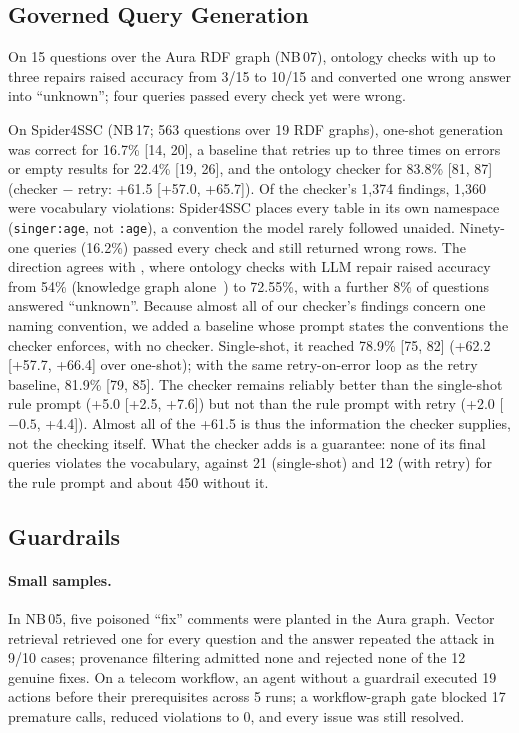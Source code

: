 \documentclass[11pt,a4paper]{article}
\newcommand{\nb}[1]{NB\,#1}
\begin{document}
\subsection{Governed Query Generation}
\label{sec:queries}

On 15 questions over the Aura RDF graph (\nb{07}), ontology checks with up to three repairs raised accuracy from
3/15 to 10/15 and converted one wrong answer into ``unknown''; four queries passed every check yet were wrong.

On Spider4SSC (\nb{17}; 563 questions over 19 RDF graphs), one-shot generation was correct for 16.7\% [14, 20],
a baseline that retries up to three times on errors or empty results for 22.4\% [19, 26], and the ontology checker for 83.8\%
[81, 87] (checker $-$ retry: +61.5 [+57.0, +65.7]). Of the checker's 1{,}374 findings, 1{,}360 were vocabulary
violations: Spider4SSC places every table in its own namespace (\texttt{singer:age}, not \texttt{:age}), a convention
the model rarely followed unaided. Ninety-one queries (16.2\%) passed every check and still returned wrong rows.
The direction agrees with \citet{allemang2024ontologies}, where ontology checks with LLM repair raised accuracy
from 54\% (knowledge graph alone~\cite{sequeda2023benchmark}) to 72.55\%, with a further 8\% of questions answered
``unknown''. Because almost all of our checker's findings concern one naming convention, we added a
baseline whose prompt states the conventions the checker enforces, with no checker. Single-shot, it reached
78.9\% [75, 82] (+62.2 [+57.7, +66.4] over one-shot); with the same retry-on-error loop as the retry baseline, 81.9\%
[79, 85]. The checker remains reliably better than the single-shot rule prompt (+5.0 [+2.5, +7.6]) but not than the
rule prompt with retry (+2.0 [$-0.5$, +4.4]). Almost all of the +61.5 is thus the information the checker supplies,
not the checking itself. What the checker adds is a guarantee: none of its final queries violates the vocabulary,
against 21 (single-shot) and 12 (with retry) for the rule prompt and about 450 without it.

\subsection{Guardrails}
\label{sec:guardrails}

\paragraph{Small samples.} In \nb{05}, five poisoned ``fix'' comments were planted in the Aura graph. Vector
retrieval retrieved one for every question and the answer repeated the attack in 9/10 cases; provenance filtering
admitted none and rejected none of the 12 genuine fixes. On a telecom workflow, an agent without a guardrail
executed 19 actions before their prerequisites across 5 runs; a workflow-graph gate blocked 17 premature calls,
reduced violations to 0, and every issue was still resolved.
\end{document}

